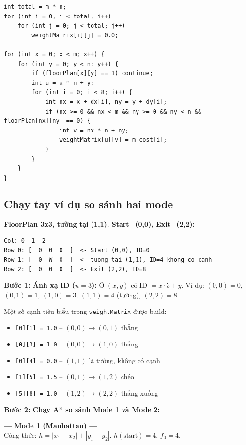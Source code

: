 \documentclass[13pt,a4paper]{article}
\begin{document}
\begin{lstlisting}[caption={Build adjacency matrix trong findEvacuationPath}]
int total = m * n;
for (int i = 0; i < total; i++)
    for (int j = 0; j < total; j++)
        weightMatrix[i][j] = 0.0;

for (int x = 0; x < m; x++) {
    for (int y = 0; y < n; y++) {
        if (floorPlan[x][y] == 1) continue;
        int u = x * n + y;
        for (int i = 0; i < 8; i++) {
            int nx = x + dx[i], ny = y + dy[i];
            if (nx >= 0 && nx < m && ny >= 0 && ny < n && floorPlan[nx][ny] == 0) {
                int v = nx * n + ny;
                weightMatrix[u][v] = m_cost[i];
            }
        }
    }
}
\end{lstlisting}

\subsection{Chạy tay ví dụ so sánh hai mode}

\textbf{FloorPlan 3x3, tường tại (1,1), Start=(0,0), Exit=(2,2):}

\begin{lstlisting}[language={}, numbers=none]
     Col: 0  1  2
Row 0: [  0  0  0  ]  <- Start (0,0), ID=0
Row 1: [  0  W  0  ]  <- tuong tai (1,1), ID=4 khong co canh
Row 2: [  0  0  0  ]  <- Exit (2,2), ID=8
\end{lstlisting}

\textbf{Bước 1: Ánh xạ ID ($n=3$):}
Ô $(x,y)$ có ID $= x \cdot 3 + y$. Ví dụ: $(0,0)=0$, $(0,1)=1$, $(1,0)=3$, $(1,1)=4$ (tường), $(2,2)=8$.

Một số cạnh tiêu biểu trong \texttt{weightMatrix} được build:
\begin{itemize}
    \item \texttt{[0][1] = 1.0} -- $(0,0) \to (0,1)$ thẳng
    \item \texttt{[0][3] = 1.0} -- $(0,0) \to (1,0)$ thẳng
    \item \texttt{[0][4] = 0.0} -- $(1,1)$ là tường, không có cạnh
    \item \texttt{[1][5] = 1.5} -- $(0,1) \to (1,2)$ chéo
    \item \texttt{[5][8] = 1.0} -- $(1,2) \to (2,2)$ thẳng xuống
\end{itemize}

\textbf{Bước 2: Chạy A* so sánh Mode 1 và Mode 2:}

\textbf{--- Mode 1 (Manhattan) ---} \\
Công thức: $h = |x_1-x_2| + |y_1-y_2|$. $h(\text{start}) = 4$, $f_0 = 4$.
\end{document}
